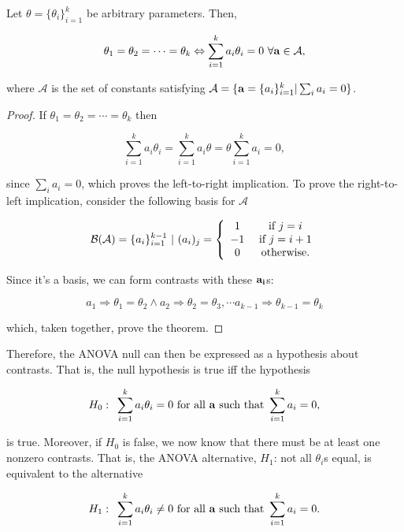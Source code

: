 \documentclass{homework}
\begin{document}
\begin{theo}
Let $\theta = \{\theta_i\}_{i=1}^{k}$ be arbitrary parameters. Then, 

$$
\theta_1 = \theta_2 = \cdots = \theta_k \Leftrightarrow \sum_{i=1}^{k} a_i \theta_i = 0 \textnormal{ } \forall {\bf a} \in \mathcal{A},
$$

where $\mathcal{A}$ is the set of constants satisfying $\mathcal{A} = \{{\bf a} = \{a_i\}_{i=1}^{k} | \sum_{i} a_i = 0\}$. \\
\end{theo}

\begin{proof}
If $\theta_1 = \theta_2 = \cdots = \theta_k$ then 

$$
\sum_{i=1}^{k} a_i \theta_i  = \sum_{i=1}^{k} a_i \theta = \theta \sum_{i=1}^{k} a_i = 0,
$$

since $\sum_{i} a_i = 0$, which proves the left-to-right implication. To prove the right-to-left implication, consider the following basis for $\mathcal{A}$

$$
\mathcal{B}(\mathcal{A}) = \{a_i\}_{i=1}^{k-1} \textnormal{ } | \textnormal{ } (a_i)_j = \left\{ \begin{array}{cc}
    1 & \textnormal{ if } j = i  \\
    -1 & \textnormal{ if } j = i+1 \\
    0 & \textnormal{ otherwise}.
\end{array} \right. 
$$

Since it's a basis, we can form contrasts with these ${\bf a_i}$s: 

$$
a_1 \Rightarrow \theta_1 = \theta_2 \land a_2 \Rightarrow \theta_2 = \theta_3, \cdots a_{k-1} \Rightarrow \theta_{k-1} = \theta_k
$$

which, taken together, prove the theorem. 
\end{proof}

Therefore, the ANOVA null can then be expressed as a hypothesis about contrasts. That is, the null hypothesis is true iff the hypothesis 

$$
H_0: \textnormal{ } \sum_{i=1}^{k} a_i \theta_i = 0 \textnormal{ for all } {\bf a} \textnormal{ such that } \sum_{i=1}^{k} a_i = 0,
$$

is true. Moreover, if $H_0$ is false, we now know that there must be at least one nonzero contrasts. That is, the ANOVA alternative, $H_1$: not all $\theta_i$s equal, is equivalent to the alternative 

$$
H_1: \textnormal{ } \sum_{i=1}^{k} a_i \theta_i \neq 0 \textnormal{ for all } {\bf a} \textnormal{ such that } \sum_{i=1}^{k} a_i = 0. \\
$$
\end{document}
